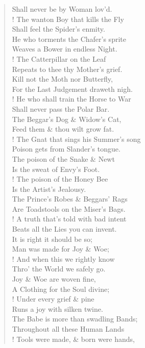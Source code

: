 \documentclass[9pt]{extarticle}
\begin{document}
\begin{verse}
\begin{altverse}
		Shall never be by Woman lov'd.\\
		!
		The wanton Boy that kills the Fly\\
		Shall feel the Spider's enmity.\\
		He who torments the Chafer's sprite\\
		Weaves a Bower in endless Night.\\
		!
		The Catterpillar on the Leaf\\
		Repeats to thee thy Mother's grief.\\
		Kill not the Moth nor Butterfly,\\
		For the Last Judgement draweth nigh.\\
		!
		He who shall train the Horse to War\\
		Shall never pass the Polar Bar.\\
		The Beggar's Dog \& Widow's Cat,\\
		Feed them \& thou wilt grow fat.\\
		!
		The Gnat that sings his Summer's song\\
		Poison gets from Slander's tongue.\\
		The poison of the Snake \& Newt\\
		Is the sweat of Envy's Foot.\\
		!
		The poison of the Honey Bee\\
		Is the Artist's Jealousy.\\
		The Prince's Robes \& Beggars' Rags\\
		Are Toadstools on the Miser's Bags.\\
		!
		A truth that's told with bad intent\\
		Beats all the Lies you can invent.\\
		It is right it should be so;\\
		Man was made for Joy \& Woe;\\
		!
		And when this we rightly know\\
		Thro' the World we safely go.\\
		Joy \& Woe are woven fine,\\
		A Clothing for the Soul divine;\\
		!
		Under every grief \& pine\\
		Runs a joy with silken twine.\\
		The Babe is more than swadling Bands;\\
		Throughout all these Human Lands\\
		!
		Tools were made, \& born were hands,\\

\end{altverse}
\end{verse}
\end{document}

